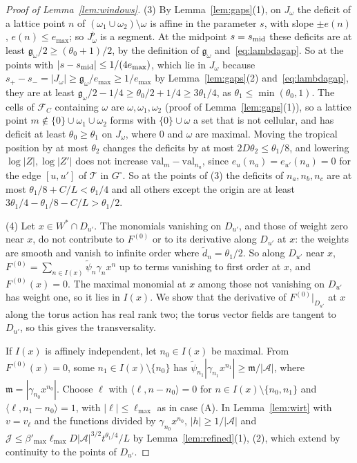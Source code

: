 \begin{proof}[Proof of Lemma~\ref{lem:windows}]
(3) By Lemma~\ref{lem:gaps}(1), on $J_\omega$ the deficit of a lattice point $n$ of $(\omega_1\cup\omega_2)\setminus\omega$ is
affine in the parameter $s$, with slope $\pm e(n)$, $e(n)\le e_{\max}$; so $J^\flat_\omega$ is a segment. At the midpoint
$s=s_{\rm mid}$ these deficits are at least $\mathfrak g_\omega/2\ge(\theta_0+1)/2$, by the definition of $\mathfrak g_\omega$
and~\eqref{eq:lambdagap}. So at the points with $|s-s_{\rm mid}|\le1/(4e_{\max})$, which lie in $J_\omega$ because
$s_+-s_-=|J_\omega|\ge\mathfrak g_\omega/e_{\max}\ge1/e_{\max}$ by Lemma~\ref{lem:gaps}(2) and~\eqref{eq:lambdagap}, they are at
least $\mathfrak g_\omega/2-1/4\ge\theta_0/2+1/4\ge3\theta_1/4$, as $\theta_1\le\min(\theta_0,1)$. The cells of $\mathcal F_C$
containing $\omega$ are $\omega,\omega_1,\omega_2$ (proof of Lemma~\ref{lem:gaps}(1)), so a lattice point
$m\notin\{0\}\cup\omega_1\cup\omega_2$ forms with $\{0\}\cup\omega$ a set that is not cellular, and has deficit at least
$\theta_0\ge\theta_1$ on $J_\omega$, where $0$ and $\omega$ are maximal. Moving the tropical position by at most $\theta_2$
changes the deficits by at most $2D\theta_2\le\theta_1/8$, and lowering $\log|Z|,\log|Z'|$ does not increase
$\mathrm{val}_m-\mathrm{val}_{n_a}$, since $e_u(n_a)=e_{u'}(n_a)=0$ for the edge $[u,u']$ of $\mathcal T$ in $G^\circ$. So at the
points of (3) the deficits of $n_a,n_b,n_c$ are at most $\theta_1/8+C/L<\theta_1/4$ and all others except the origin are
at least $3\theta_1/4-\theta_1/8-C/L>\theta_1/2$.

(4) Let $x\in W^*\cap D_{u'}$. The monomials vanishing on $D_{u'}$, and those of weight zero near $x$, do not contribute
to $F^{(0)}$ or to its derivative along $D_{u'}$ at $x$: the weights are smooth and vanish to infinite order where
$\tilde d_n=\theta_1/2$. So along $D_{u'}$ near $x$, $F^{(0)}=\sum_{n\in I(x)}\tilde\psi_n\gamma_nx^n$ up to terms vanishing
to first order at $x$, and $F^{(0)}(x)=0$. The maximal monomial at $x$ among those not vanishing on $D_{u'}$ has weight
one, so it lies in $I(x)$. We show that the derivative of $F^{(0)}|_{D_{u'}}$ at $x$ along the torus action has real rank
two; the torus vector fields are tangent to $D_{u'}$, so this gives the transversality.

If $I(x)$ is affinely independent, let $n_0\in I(x)$ be maximal. From $F^{(0)}(x)=0$, some $n_1\in I(x)\setminus\{n_0\}$
has $\tilde\psi_{n_1}|\gamma_{n_1}x^{n_1}|\ge\mathfrak m/|\mathcal A|$, where $\mathfrak m=|\gamma_{n_0}x^{n_0}|$. Choose $\ell$ with
$\langle\ell,n-n_0\rangle=0$ for $n\in I(x)\setminus\{n_0,n_1\}$ and $\langle\ell,n_1-n_0\rangle=1$, with
$|\ell|\le\ell_{\max}$ as in case (A). In Lemma~\ref{lem:wirt} with $v=v_\ell$ and the functions divided by
$\gamma_{n_0}x^{n_0}$, $|h|\ge1/|\mathcal A|$ and $\mathcal J\le\beta'_{\max}\ell_{\max}D|\mathcal A|^{3/2}t^{\theta_1/4}/L$ by
Lemma~\ref{lem:refined}(1), (2), which extend by continuity to the points of $D_{u'}$.


\end{proof}

